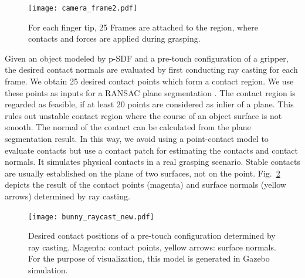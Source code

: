 \begin{figure}[!htbp]
\centering
\texttt{[image: camera\_frame2.pdf]}
\captionsetup{justification=raggedright}
\caption{For each finger tip, 25 Frames are attached to the region, where contacts and forces are applied during grasping.}
\label{fig:simulated_sensor}       %
\end{figure}   

Given an object modeled by p-SDF and a pre-touch configuration of a gripper, the desired contact normals are evaluated by first conducting ray casting for each frame. We obtain 25 desired contact points which form a contact region.  We use these points as inputs for a RANSAC plane segmentation \cite{Zuliani2008}. The contact region is regarded as feasible, if at least 20 points are considered as inlier of a plane. This rules out unstable contact region where the course of an object surface is not smooth. The normal of the contact can be calculated from the plane segmentation result. In this way, we avoid using a point-contact model to evaluate contacts but use a contact patch for estimating the contacts and contact normals. It simulates physical contacts in a real grasping scenario. Stable contacts are usually established on the plane of two surfaces, not on the point.  Fig.~\ref{fig:bunny_raycast} depicts the result of the contact points (magenta) and surface normals (yellow arrows) determined by ray casting.

\begin{figure}[!htbp]
\centering
\texttt{[image: bunny\_raycast\_new.pdf]}
\captionsetup{justification=raggedright}
\caption{Desired contact positions of a pre-touch configuration determined by ray casting. Magenta: contact points, yellow arrows: surface normals. For  the purpose of visualization, this model is generated in Gazebo simulation.}
\label{fig:bunny_raycast}       %
\end{figure} 



